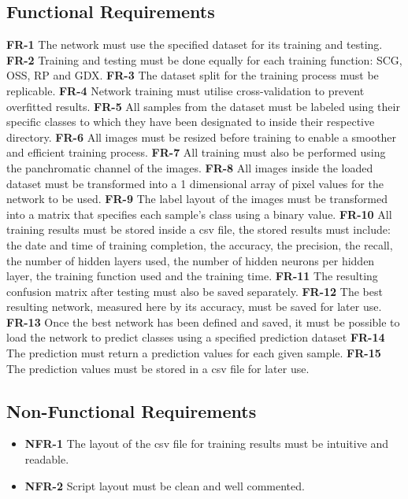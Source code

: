 \subsection{Functional Requirements}
\begin{outline}
    \1 \textbf{FR-1} The network must use the specified dataset for its training and testing.
    \1 \textbf{FR-2} Training and testing must be done equally for each training function: SCG, OSS, RP and GDX.
    \1 \textbf{FR-3} The dataset split for the training process must be replicable.
    \1 \textbf{FR-4} Network training must utilise cross-validation to prevent overfitted results.
    \1 \textbf{FR-5} All samples from the dataset must be labeled using their specific classes to which they have been designated to inside their respective directory.
    \1 \textbf{FR-6} All images must be resized before training to enable a smoother and efficient training process.
    \1 \textbf{FR-7} All training must also be performed using the panchromatic channel of the images.
    \1 \textbf{FR-8} All images inside the loaded dataset must be transformed into a 1 dimensional array of pixel values for the network to be used.
    \1 \textbf{FR-9} The label layout of the images must be transformed into a matrix that specifies each sample's class using a binary value.
    \1 \textbf{FR-10} All training results must be stored inside a csv file, the stored results must include: the date and time of training completion, the accuracy, the precision, the recall, the number of hidden layers used, the number of hidden neurons per hidden layer, the training function used and the training time.
    \1 \textbf{FR-11} The resulting confusion matrix after testing must also be saved separately.
    \1 \textbf{FR-12} The best resulting network, measured here by its accuracy, must be saved for later use.
    \1 \textbf{FR-13} Once the best network has been defined and saved, it must be possible to load the network to predict classes using a specified prediction dataset
    \1 \textbf{FR-14} The prediction must return a prediction values for each given sample.
    \1 \textbf{FR-15} The prediction values must be stored in a csv file for later use.
\end{outline}

\subsection{Non-Functional Requirements}
\begin{itemize}
    \item \textbf{NFR-1} The layout of the csv file for training results must be intuitive and readable.
    \item \textbf{NFR-2} Script layout must be clean and well commented.
\end{itemize}
